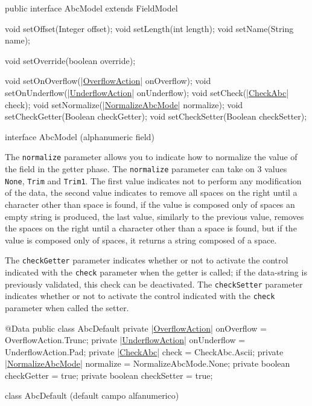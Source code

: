 \documentclass[a4paper,10pt]{report}
\newenvironment{elisting}[1][H]
  {\captionsetup{aboveskip=0pt}\begin{listing}[#1]}
  {\end{listing}%
}
\begin{document}
\begin{elisting}[!htb]
\begin{javacode}
public interface AbcModel extends FieldModel {
    void setOffset(Integer offset);
    void setLength(int length);
    void setName(String name);

    void setOverride(boolean override);

    void setOnOverflow(|\hyperref[lst:OverflowAction]{OverflowAction}| onOverflow);
    void setOnUnderflow(|\hyperref[lst:UnderflowAction]{UnderflowAction}| onUnderflow);
    void setCheck(|\hyperref[lst:CheckAbc]{CheckAbc}| check);
    void setNormalize(|\hyperref[lst:NormalizeAbcMode]{NormalizeAbcMode}| normalize);
    void setCheckGetter(Boolean checkGetter);
    void setCheckSetter(Boolean checkSetter);
}
\end{javacode}
\caption{interface AbcModel (alphanumeric field)}
\label{lst:AbcModel}
\end{elisting}

The \hypertarget{abc:nrm}{\texttt{normalize}} parameter allows you to indicate 
how to normalize the value of the field in the getter phase. 
The \verb!normalize! parameter can take on 3 values \verb!None!, \verb!Trim! 
and \verb!Trim1!. The first value indicates not to perform any modification of 
the data, the second value indicates to remove all spaces on the right until a 
character other than space is found, if the value is composed only of spaces an 
empty string is produced, the last value, similarly to the previous value, 
removes the spaces on the right until a character other than a space is found, 
but if the value is composed only of spaces, it returns a string composed of a 
space.

The \hypertarget{abc:get}{\texttt{checkGetter}} parameter indicates whether or 
not to activate the control indicated with the \verb!check! parameter when the 
getter is called; if the data-string is previously validated, this check can be 
deactivated. 
The \hypertarget{abc:set}{\texttt{checkSetter}} parameter indicates whether or 
not to activate the control indicated with the \verb!check! parameter when 
called the setter.

\begin{elisting}[!htb]
\begin{javacode}
@Data
public class AbcDefault {
    private |\hyperref[lst:OverflowAction]{OverflowAction}| onOverflow = OverflowAction.Trunc;
    private |\hyperref[lst:UnderflowAction]{UnderflowAction}| onUnderflow = UnderflowAction.Pad;
    private |\hyperref[lst:CheckAbc]{CheckAbc}| check = CheckAbc.Ascii;
    private |\hyperref[lst:NormalizeAbcMode]{NormalizeAbcMode}| normalize = NormalizeAbcMode.None;
    private boolean checkGetter = true;
    private boolean checkSetter = true;
}
\end{javacode}
\caption{class AbcDefault (default campo alfanumerico)}
\label{lst:AbcDefault}
\end{elisting}
\end{document}
